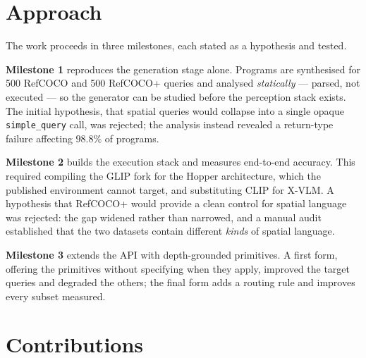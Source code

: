 \documentclass[12pt,a4paper,oneside]{report}
\begin{document}
\section{Approach}

The work proceeds in three milestones, each stated as a hypothesis and tested.

\textbf{Milestone 1} reproduces the generation stage alone. Programs are synthesised
for 500 RefCOCO and 500 RefCOCO+ queries and analysed \emph{statically} --- parsed,
not executed --- so the generator can be studied before the perception stack exists.
The initial hypothesis, that spatial queries would collapse into a single opaque
\texttt{simple\_query} call, was rejected; the analysis instead revealed a return-type
failure affecting $98.8\%$ of programs.

\textbf{Milestone 2} builds the execution stack and measures end-to-end accuracy.
This required compiling the GLIP fork for the Hopper architecture, which the published
environment cannot target, and substituting CLIP \cite{radford2021clip} for X-VLM.
A hypothesis that RefCOCO+ would provide a clean control for spatial language was
rejected: the gap widened rather than narrowed, and a manual audit established that
the two datasets contain different \emph{kinds} of spatial language.

\textbf{Milestone 3} extends the API with depth-grounded primitives. A first form,
offering the primitives without specifying when they apply, improved the target
queries and degraded the others; the final form adds a routing rule and improves every
subset measured.

\section{Contributions}
\end{document}
